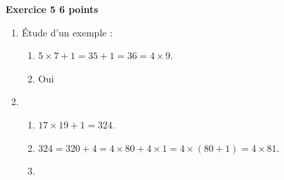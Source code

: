 \textbf{Exercice 5 \hfill 6 points}

\medskip
 
%
 
\begin{enumerate}
\item Étude d'un exemple :
 
	\begin{enumerate}
		\item %
$5 \times 7 + 1 = 35 + 1 = 36 = 4 \times 9$.
		\item %
		Oui	
	\end{enumerate} 
\item %


	\begin{enumerate}
		\item %
		$17 \times 19 + 1 = 324$. 
		\item %
$324 = 320 + 4 = 4 \times 80 + 4\times 1 = 4 \times (80 + 1) = 4 \times 81$.
		\item %


\end{enumerate}
\end{enumerate}
